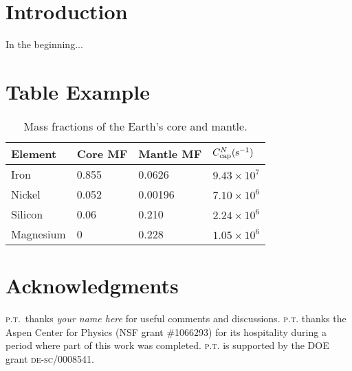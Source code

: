 \documentclass[12pt]{article}
\numberwithin{equation}{section}    %
\renewcommand{\text}{\textnormal}	%
\begin{document}

\section{Introduction}

In the beginning... 

\section{Table Example}

 
\begin{table}
	\renewcommand{\arraystretch}{1.3} %
	\centering
	\begin{tabular}{ @{} llll @{} } \toprule %
		Element & Core MF & Mantle MF & $C_\text{cap}^N (\text{s}^{-1})$ 
		\\ \hline
		Iron & 0.855 & 0.0626 & $9.43\times 10^{7}$ 
		\\
		Nickel & 0.052 & 0.00196 & $7.10\times 10^{6}$ 
		\\
		Silicon & 0.06 & 0.210 & $2.24\times 10^{6}$ 
		\\
		Magnesium & 0 & 0.228 & $1.05\times 10^{6}$ 
		\\ \bottomrule
	\end{tabular}
	\caption{
		Mass fractions of the Earth's core and mantle.
		\label{table:elements}
	}
\end{table}


 \section*{Acknowledgments}


%
\textsc{p.t.}\ thanks 
\emph{your name here}
for useful comments and discussions. 
%
\textsc{p.t.} thanks the Aspen Center for Physics (NSF grant \#1066293) for its hospitality during a period where part of this work was completed. \textsc{p.t.} is supported by the DOE grant \textsc{de-sc}/0008541.



% 
\end{document}
